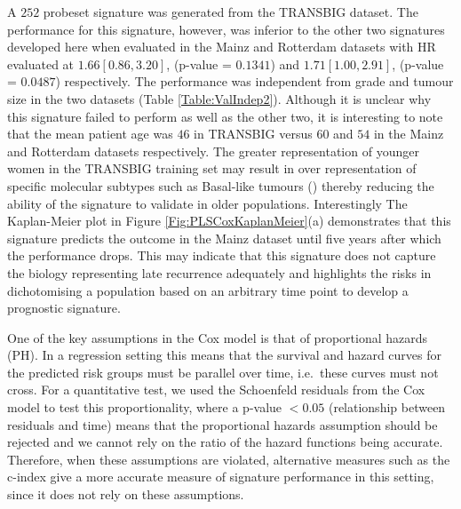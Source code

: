 \documentclass[letterpaper,12pt]{article}
\begin{document}
A $252$ probeset signature was generated from the TRANSBIG dataset. The performance for this signature, however, was inferior to the other two signatures developed here when evaluated in the Mainz and Rotterdam datasets with HR evaluated at $1.66 [0.86, 3.20]$, (p-value = $0.1341$) and $1.71 [1.00, 2.91]$, (p-value = $0.0487$) respectively. The performance was independent from grade and tumour size in the two datasets (Table \ref{Table:ValIndep2}). Although it is unclear why this signature failed to perform as well as the other two, it is interesting to note that the mean patient age was $46$ in TRANSBIG versus $60$ and $54$ in the Mainz and Rotterdam datasets respectively. The greater representation of younger women in the TRANSBIG training set may result in over representation of specific molecular subtypes such as Basal-like tumours (\citet{Millikan:08}) thereby reducing the ability of the signature to validate in older populations. Interestingly The Kaplan-Meier plot in Figure %
\ref{Fig:PLSCoxKaplanMeier}(a) demonstrates that this signature predicts the outcome in the Mainz dataset until five years after which the performance drops. This may indicate that this signature does not capture the biology representing late recurrence adequately and highlights the risks in dichotomising a population based on an arbitrary time point to develop a prognostic signature. 

One of the key assumptions in the Cox model is that of proportional hazards (PH). In a regression setting this means that the survival and hazard curves for the predicted risk groups must be parallel over time, i.e.\ these curves must not cross. For a quantitative test, we used the Schoenfeld residuals from the Cox model to test this proportionality, where a p-value $< 0.05$ (relationship between residuals and time) means that the proportional hazards assumption should be rejected and we cannot rely on the ratio of the hazard functions being accurate. Therefore, when these assumptions are violated, alternative measures such as the c-index give a more accurate measure of signature performance in this setting, since it does not rely on these assumptions.
\end{document}
